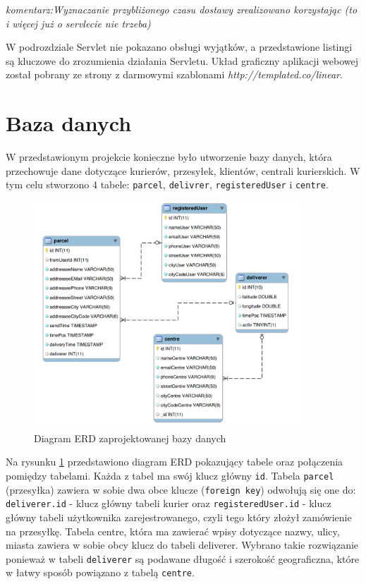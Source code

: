 \documentclass[eng,printmode,oneside]{mgr}
\begin{document}
\emph{\color{komentarz}komentarz:Wyznaczanie przybliżonego czasu dostawy
zrealizowano korzystając (to i więcej już o servlecie nie trzeba)}

W podrozdziale Servlet nie pokazano obsługi wyjątków, a przedstawione listingi
są kluczowe do zrozumienia działania Servletu. Układ graficzny aplikacji webowej
został pobrany ze strony z darmowymi szablonami
{\textit{http://templated.co/linear}}.

\newpage
\section{Baza danych}

W przedstawionym projekcie konieczne było utworzenie bazy danych, która
przechowuje dane dotyczące kurierów, przesyłek, klientów, centrali kurierskich.
W tym celu stworzono 4 tabele: \texttt{parcel}, \texttt{delivrer},
\texttt{registeredUser} i \texttt{centre}.

\begin{figure}[ht!]
\centering
\includegraphics[width=0.9\textwidth]{ERD.png}
\caption{Diagram ERD zaprojektowanej bazy danych}
\label{fig:ERD}
\end{figure}

Na rysunku \ref{fig:ERD} przedstawiono diagram ERD pokazujący tabele oraz
połączenia pomiędzy tabelami. Każda z tabel ma swój klucz główny \texttt{id}. Tabela
\texttt{parcel} (przesyłka) zawiera w sobie dwa obce klucze (\texttt{foreign
key}) odwołują się one do: \texttt{deliverer.id} - klucz główny
tabeli kurier oraz \texttt{registeredUser.id} - klucz główny tabeli użytkownika zarejestrowanego,
czyli tego który złożył zamówienie na przesyłkę. Tabela centre, która ma
zawierać wpisy dotyczące nazwy, ulicy, miasta zawiera w sobie obcy klucz do
tabeli deliverer. Wybrano takie rozwiązanie ponieważ w tabeli \texttt{deliverer}
są podawane długość i szerokość geograficzna, które w łatwy sposób powiązano z
tabelą \texttt{centre}.
\end{document}
